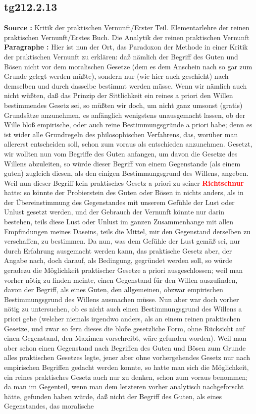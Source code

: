 \documentclass[a4paper,12pt,twoside]{book}
\newcommand{\match}[1]{\textcolor{red}{\textbf{#1}}}
\begin{document}
	\subsection*{tg212.2.13} 
	\textbf{Source : }Kritik der praktischen Vernunft/Erster Teil. Elementarlehre der reinen praktischen Vernunft/Erstes Buch. Die Analytik der reinen praktischen Vernunft\\  
	
	\noindent\textbf{Paragraphe : }Hier ist nun der Ort, das Paradoxon der Methode in einer Kritik der praktischen Vernunft zu erklären: daß nämlich der Begriff des Guten und Bösen nicht vor dem moralischen Gesetze (dem es dem Anschein nach so gar zum Grunde gelegt werden müßte), sondern nur (wie hier auch geschieht) nach demselben und durch dasselbe bestimmt werden müsse. Wenn wir nämlich auch nicht wüßten, daß das Prinzip der Sittlichkeit ein reines a priori den Willen bestimmendes Gesetz sei, so müßten wir doch, um nicht ganz umsonst (gratis)  Grundsätze anzunehmen, es anfänglich wenigstens unausgemacht lassen, ob der Wille bloß empirische, oder auch reine Bestimmungsgründe a priori habe; denn es ist wider alle Grundregeln des philosophischen Verfahrens, das, worüber man allererst entscheiden soll, schon zum voraus als entschieden anzunehmen. Gesetzt, wir wollten nun vom Begriffe des Guten anfangen, um davon die Gesetze des Willens abzuleiten, so würde dieser Begriff von einem Gegenstande (als einem guten) zugleich diesen, als den einigen Bestimmungsgrund des Willens, angeben. Weil nun dieser Begriff kein praktisches Gesetz a priori zu seiner \match{Richtschnur} hatte: so könnte der Probierstein des Guten oder Bösen in nichts anders, als in der Übereinstimmung des Gegenstandes mit unserem Gefühle der Lust oder Unlust gesetzt werden, und der Gebrauch der Vernunft könnte nur darin bestehen, teils diese Lust oder Unlust im ganzen Zusammenhange mit allen Empfindungen meines Daseins, teils die Mittel, mir den Gegenstand derselben zu verschaffen, zu bestimmen. Da nun, was dem Gefühle der Lust gemäß sei, nur durch Erfahrung ausgemacht werden kann, das praktische Gesetz aber, der Angabe nach, doch darauf, als Bedingung, gegründet werden soll, so würde geradezu die Möglichkeit praktischer Gesetze a priori ausgeschlossen; weil man vorher nötig zu finden meinte, einen Gegenstand für den Willen auszufinden, davon der Begriff, als eines Guten, den allgemeinen, obzwar empirischen Bestimmungsgrund des Willens ausmachen müsse. Nun aber war doch vorher nötig zu untersuchen, ob es nicht auch einen Bestimmungsgrund des Willens a priori gebe (welcher niemals irgendwo anders, als an einem reinen praktischen Gesetze, und zwar so fern dieses die bloße gesetzliche Form, ohne Rücksicht auf einen Gegenstand, den Maximen vorschreibt, wäre gefunden worden). Weil man aber schon einen Gegenstand nach Begriffen des Guten und Bösen zum Grunde alles praktischen Gesetzes legte, jener aber ohne vorhergehendes Gesetz nur nach empirischen Begriffen gedacht werden konnte, so hatte man sich die Möglichkeit, ein reines praktisches Gesetz auch nur zu denken, schon zum voraus benommen;  da man im Gegenteil, wenn man dem letzteren vorher analytisch nachgeforscht hätte, gefunden haben würde, daß nicht der Begriff des Guten, als eines Gegenstandes, das moralische 
\end{document}
